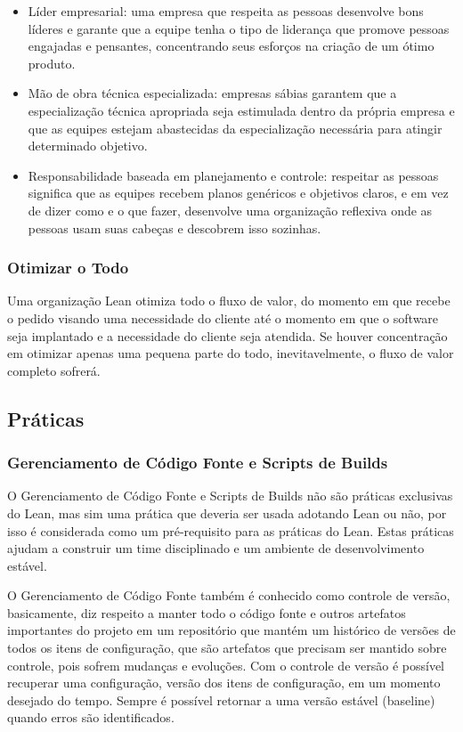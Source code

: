 \begin{itemize}
\item Líder empresarial: uma empresa que respeita as pessoas desenvolve bons líderes e garante que a equipe tenha o tipo de liderança que promove pessoas engajadas e pensantes, concentrando seus esforços na criação de um ótimo produto.
\item Mão de obra técnica especializada: empresas sábias garantem que a especialização técnica apropriada seja estimulada dentro da própria empresa e que as equipes estejam abastecidas da especialização necessária para atingir determinado objetivo.
\item Responsabilidade baseada em planejamento e controle: respeitar as pessoas significa que as equipes recebem planos genéricos e objetivos claros, e em vez de dizer como e o que fazer, desenvolve uma organização reflexiva onde as pessoas usam suas cabeças e descobrem isso sozinhas.
\end{itemize}

\subsubsection[Otimizar o Todo]{Otimizar o Todo}

Uma organização Lean otimiza todo o fluxo de valor, do momento em que recebe o pedido visando uma necessidade do cliente até o momento em que o software seja implantado e a necessidade do cliente seja atendida. Se houver concentração em otimizar apenas uma pequena parte do todo, inevitavelmente, o fluxo de valor completo sofrerá. 

\subsection[ Práticas]{ Práticas}

\subsubsection[Gerenciamento de Código Fonte e Scripts de Builds]{Gerenciamento de Código Fonte e Scripts de Builds}

O Gerenciamento de Código Fonte e Scripts de Builds não são práticas exclusivas do Lean, mas sim uma prática que deveria ser usada adotando Lean ou não, por isso é considerada como um pré-requisito para as práticas do Lean. Estas práticas ajudam a construir um time disciplinado e um ambiente de desenvolvimento estável.

O Gerenciamento de Código Fonte também é conhecido como controle de versão, basicamente, diz respeito a manter todo o código fonte e outros artefatos importantes do projeto em um repositório que mantém um histórico de versões de todos os itens de configuração, que são artefatos que precisam ser mantido sobre controle, pois sofrem mudanças e evoluções. Com o controle de versão é possível recuperar uma configuração, versão dos itens de configuração, em um momento desejado do tempo. Sempre é possível retornar a uma versão estável (baseline) quando erros são identificados.

